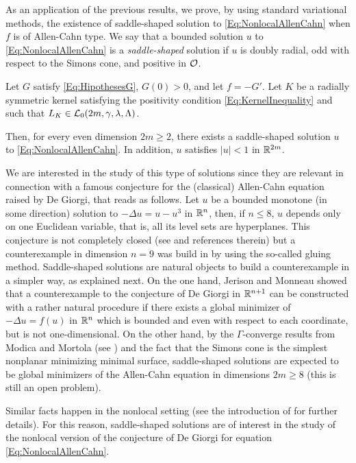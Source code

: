 As an application of the previous results, we prove, by using standard variational methods, the existence of saddle-shaped solution to \eqref{Eq:NonlocalAllenCahn} when $f$ is of Allen-Cahn type. We say that a bounded solution $u$ to \eqref{Eq:NonlocalAllenCahn} is a \emph{saddle-shaped} solution if $u$ is doubly radial, odd with respect to the Simons cone, and positive in $\mathcal{O}$. 

\begin{theorem}
	\label{Th:Existence}
    Let $G$ satisfy \eqref{Eq:HipothesesG}, $G(0)>0$, and let $f=-G'$. Let $K$ be a radially symmetric kernel satisfying the positivity condition \eqref{Eq:KernelInequality} and such that $L_K\in \mathcal{L}_0(2m, \gamma, \lambda, \Lambda)$. 
    
    Then, for every even dimension $2m \geq 2$, there exists a saddle-shaped solution $u$ to \eqref{Eq:NonlocalAllenCahn}. In addition, $u$ satisfies $|u|<1$ in $\mathbb{R}^{2m}$.
\end{theorem}

We are interested in the study of this type of solutions since they are relevant in connection with a famous conjecture for the (classical) Allen-Cahn equation raised by De Giorgi, that reads as follows. Let $u$ be a bounded monotone (in some direction) solution to $-\Delta u = u - u^3$ in $\mathbb{R}^n$, then, if $n \leq 8$, $u$ depends only on one Euclidean variable, that is, all its level sets are hyperplanes. This conjecture is not completely closed (see \cite{FarinaValdinoci-DeGiorgi} and references therein) but a counterexample in dimension $n=9$ was build in \cite{delPinoKowalczykWei} by using the so-called gluing method. Saddle-shaped solutions are natural objects to build a counterexample in a simpler way, as explained next. On the one hand, Jerison and Monneau \cite{JerisonMonneau} showed that a counterexample to the conjecture of De Giorgi in $\mathbb{R}^{n+1}$ can be constructed with a rather natural procedure if there exists a global minimizer of $-\Delta u = f(u)$ in $\mathbb{R}^n$ which is bounded and even with respect to each coordinate, but is not one-dimensional. On the other hand, by the $\Gamma$-converge results from Modica and Mortola (see \cite{Modica,ModicaMortola}) and the fact that the Simons cone is the simplest nonplanar minimizing minimal surface, saddle-shaped solutions are expected to be global minimizers of the Allen-Cahn equation in dimensions $2m\geq 8$ (this is still an open problem).

Similar facts happen in the nonlocal setting (see the introduction of \cite{Felipe-Sanz-Perela:SaddleFractional} for further details). For this reason, saddle-shaped solutions are of interest in the study of the nonlocal version of the conjecture of De Giorgi for equation \eqref{Eq:NonlocalAllenCahn}.

